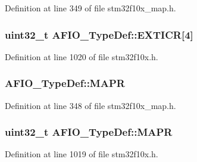 Definition at line 349 of file stm32f10x\+\_\+map.\+h.

\subsubsection[{\texorpdfstring{E\+X\+T\+I\+CR}{EXTICR}}]{ {\bf uint32\+\_\+t} A\+F\+I\+O\+\_\+\+Type\+Def\+::\+E\+X\+T\+I\+CR\mbox{[}4\mbox{]}}\hypertarget{struct_a_f_i_o___type_def_a5f590aa12271be60c2f61b0a6d2b8772}{}\label{struct_a_f_i_o___type_def_a5f590aa12271be60c2f61b0a6d2b8772}


Definition at line 1020 of file stm32f10x.\+h.

\subsubsection[{\texorpdfstring{M\+A\+PR}{MAPR}}]{ A\+F\+I\+O\+\_\+\+Type\+Def\+::\+M\+A\+PR}\hypertarget{struct_a_f_i_o___type_def_a810de55f3ca9e0382a66a5fecc3bf2dd}{}\label{struct_a_f_i_o___type_def_a810de55f3ca9e0382a66a5fecc3bf2dd}


Definition at line 348 of file stm32f10x\+\_\+map.\+h.

\subsubsection[{\texorpdfstring{M\+A\+PR}{MAPR}}]{ {\bf uint32\+\_\+t} A\+F\+I\+O\+\_\+\+Type\+Def\+::\+M\+A\+PR}\hypertarget{struct_a_f_i_o___type_def_a2b44ba1a427df7d8c0b254f869b9b463}{}\label{struct_a_f_i_o___type_def_a2b44ba1a427df7d8c0b254f869b9b463}


Definition at line 1019 of file stm32f10x.\+h.

